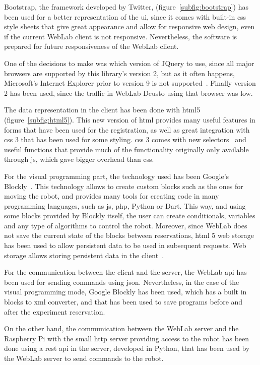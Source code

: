 Bootstrap, the framework developed by Twitter, (figure~\ref{subfig:bootstrap}) has been used for a
better representation of the \acrlong{ui}, since it comes with built-in \acrshort{css} style
sheets that give great appearance and allow for responsive web design, even if the current WebLab
client is not responsive. Nevertheless, the software is prepared for future responsiveness of the
WebLab client.

One of the decisions to make was which version of JQuery to use, since all major browsers are
supported by this library's version 2, but as it often happens, Microsoft's Internet Explorer prior
to version 9 is not supported~\cite{jquery_versions}. Finally version 2 has been used, since the
traffic in WebLab Deusto using that browser was low.

The data representation in the client has been done with \acrshort{html}5~\cite{html5_spec}
(figure~\ref{subfig:html5}). This new version of \acrshort{html} provides many useful features in
forms that have been used for the registration, as well as great integration with \acrshort{css} 3
that has been used for some styling. \acrshort{css} 3 comes with new selectors~\cite{css3_sel} and
useful functions that provide much of the functionality originally only available through
\acrlong{js}, which gave bigger overhead than \acrshort{css}.

For the visual programming part, the technology used has been Google's Blockly~\cite{blockly}. This
technology allows to create custom blocks such as the ones for moving the robot, and provides many
tools for creating code in many programming languages, such as \acrlong{js}, \acrshort{php}, Python
or Dart. This way, and using some blocks provided by Blockly itself, the user can create
conditionals, variables and any type of algorithms to control the robot. Moreover, since WebLab does
not save the current state of the blocks between reservations, \acrshort{html} 5 web storage has
been used to allow persistent data to be used in subsequent requests. Web storage allows storing
persistent data in the client~\cite{web_storage}.

For the communication between the client and the server, the WebLab \acrshort{api} has been used for
sending commands using \acrshort{json}. Nevertheless, in the case of the visual programming mode,
Google Blockly has been used, which has a built in blocks to \acrshort{xml} converter, and that has
been used to save programs before and after the experiment reservation.

On the other hand, the communication between the WebLab server and the Raspberry Pi with the small
\acrshort{http} server providing access to the robot has been done using a \acrshort{rest}
\acrshort{api} in the server, developed in Python, that has been used by the WebLab server to send
commands to the robot.

